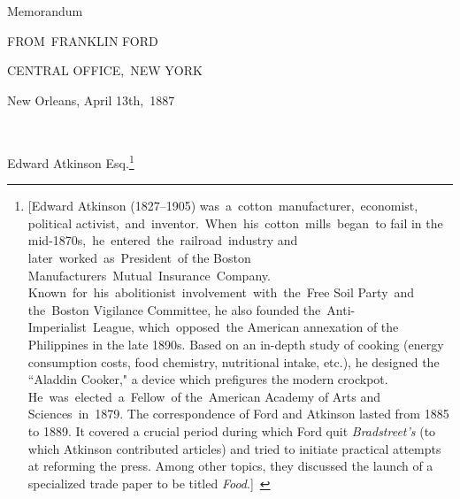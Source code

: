 \documentclass[twoside,symmetric,nobib,justified]{tufte-book}
\begin{document}
\vspace{.2in}

\begin{LARGE}
    



\end{LARGE}

\vspace{0.5in}


\begin{center}
    


Memorandum

\vspace{.1in}

\Large{FROM~FRANKLIN FORD}

\end{center}

\vspace{.1in}

\noindent CENTRAL OFFICE,~NEW YORK~~~~~~~

\vspace{.15in}

\hfill New Orleans, April 13th,~1887

~

\noindent Edward Atkinson Esq.\footnote{{[}Edward Atkinson (1827--1905)
  was~a~cotton~manufacturer,~economist, political
  activist,~and~inventor.~When~his~cotton~mills~began~to fail in the
  mid-1870s,~he~entered~the~railroad~industry and
  later~worked~as~President~of the Boston
  Manufacturers~Mutual~Insurance~Company.
  Known~for~his~abolitionist~involvement~with~the~Free Soil Party~and
  the~Boston Vigilance Committee, he also founded
  the~Anti-Imperialist~League, which~opposed~the American annexation of
  the Philippines in the late 1890s. Based on an in-depth study of
  cooking (energy consumption costs, food chemistry, nutritional intake,
  etc.), he designed the ``Aladdin Cooker," a device which prefigures
  the modern crockpot. He~was~elected~a~Fellow~of the~American Academy
  of Arts and Sciences~in~1879. The correspondence of Ford and Atkinson
  lasted from 1885 to 1889. It covered a crucial period during which
  Ford quit \emph{Bradstreet's} (to which Atkinson contributed articles)
  and tried to initiate practical attempts at reforming the press. Among
  other topics, they discussed the launch of a specialized trade paper
  to be titled \emph{Food}.{]}~}
\end{document}
